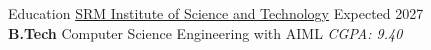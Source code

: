 \documentclass{resume} %
\begin{document}















\begin{rSection}{Education}
    \href{https://www.linkedin.com/school/s.r.m.-institute-of-science-&-technology-chennai/}{SRM Institute of Science and Technology} \hfill Expected 2027\\
\textbf{B.Tech} Computer Science Engineering with AIML \hfill \textit{CGPA: 9.40}
\end{rSection}
\end{document}
